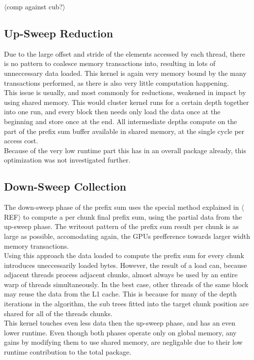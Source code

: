 \documentclass{tudscrreprt}
\newcommand{\markr}[1]{\textcolor{review}{$\langle$#1$\rangle$}}
\begin{document}
			\markr{comp against cub?}
		
			\subsection{Up-Sweep Reduction}
				Due to the large offset and stride of the elements accessed by each thread, there is no pattern to coalesce memory transactions into, resulting in lots of unneccessary data loaded. This kernel is again very memory bound by the many transactions performed, as there is also very little computation happening. \\
				This issue is usually, and most commonly for reductions, weakened in impact by using shared memory. This would cluster kernel runs for a certain depth together into one run, and every block then needs only load the data once at the beginning and store once at the end. All intermediate depths compute on the part of the prefix sum buffer available in shared memory, at the single cycle per access cost. \\
				Because of the very low runtime part this has in an overall package already, this optimization was not investigated further. \\
			 
			\subsection{Down-Sweep Collection}
				The down-sweep phase of the prefix sum uses the special method explained in \markr{REF} to compute a per chunk final prefix sum, using the partial data from the up-sweep phase. The writeout pattern of the prefix sum result per chunk is as large as possible, accomodating again, the GPUs prefference towards larger width memory transactions. \\
				Using this approach the data loaded to compute the prefix sum for every chunk introduces uneccessarily loaded bytes. However, the result of a load can, because adjacent threads process adjacent chunks, almost always be used by an entire warp of threads simultaneously. In the best case, other threads of the same block may reuse the data from the L1 cache. This is because for many of the depth iterations in the algorithm, the sub trees fitted into the target chunk position are shared for all of the threads chunks. \\
				
				This kernel touches even less data then the up-sweep phase, and has an even lower runtime. Even though both phases operate only on global memory, any gains by modifying them to use shared memory, are negligable due to their low runtime contribution to the total package.
		
\end{document}
